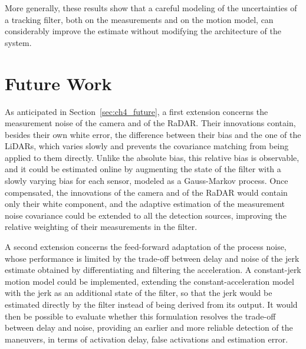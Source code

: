 More generally, these results show that a careful modeling of the uncertainties of a tracking
filter, both on the measurements and on the motion model, can considerably improve the
estimate without modifying the architecture of the system.

\section{Future Work}
\label{sec:future_work}

As anticipated in Section~\ref{sec:ch4_future}, a first extension concerns the measurement
noise of the camera and of the RaDAR. Their innovations contain, besides their own white
error, the difference between their bias and the one of the LiDARs, which varies slowly and
prevents the covariance matching from being applied to them directly. Unlike the absolute
bias, this relative bias is observable, and it could be estimated online by augmenting the
state of the filter with a slowly varying bias for each sensor, modeled as a Gauss-Markov
process. Once compensated, the innovations of the camera and of the RaDAR would contain only
their white component, and the adaptive estimation of the measurement noise covariance could
be extended to all the detection sources, improving the relative weighting of their
measurements in the filter.

A second extension concerns the feed-forward adaptation of the process noise, whose
performance is limited by the trade-off between delay and noise of the jerk estimate obtained
by differentiating and filtering the acceleration. A constant-jerk motion model could be
implemented, extending the constant-acceleration model with the jerk as an additional state of
the filter, so that the jerk would be estimated directly by the filter instead of being
derived from its output. It would then be possible to evaluate whether this formulation
resolves the trade-off between delay and noise, providing an earlier and more reliable
detection of the maneuvers, in terms of activation delay, false activations and estimation
error.

